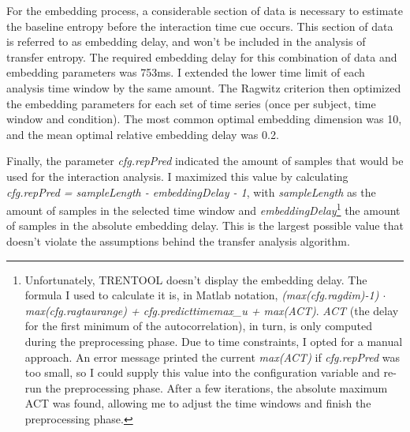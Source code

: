 For the embedding process, a considerable section of data is necessary to estimate the baseline entropy before the interaction time cue occurs.
This section of data is referred to as embedding delay, and won't be included in the analysis of transfer entropy.
The required embedding delay for this combination of data and embedding parameters was 753ms.
I extended the lower time limit of each analysis time window by the same amount.
The Ragwitz criterion then optimized the embedding parameters for each set of time series (once per subject, time window and condition).
The most common optimal embedding dimension was 10, and the mean optimal relative embedding delay was 0.2.

Finally, the parameter \emph{cfg.repPred} indicated the amount of samples that would be used for the interaction analysis.
I maximized this value by calculating \emph{cfg.repPred = sampleLength - embeddingDelay - 1}, with \emph{sampleLength} as the amount of samples in the selected time window and \emph{embeddingDelay}\footnote{Unfortunately, TRENTOOL doesn't display the embedding delay. The formula I used to calculate it is, in Matlab notation, \emph{(max(cfg.ragdim)-1) $\cdot$ max(cfg.ragtaurange) + cfg.predicttimemax\_u + max(ACT)}. \emph{ACT} (the delay for the first minimum of the autocorrelation), in turn, is only computed during the preprocessing phase. Due to time constraints, I opted for a manual approach. An error message printed the current \emph{max(ACT)} if \emph{cfg.repPred} was too small, so I could supply this value into the configuration variable and re-run the preprocessing phase. After a few iterations, the absolute maximum ACT was found, allowing me to adjust the time windows and finish the preprocessing phase.} the amount of samples in the absolute embedding delay.
This is the largest possible value that doesn't violate the assumptions behind the transfer analysis algorithm.



